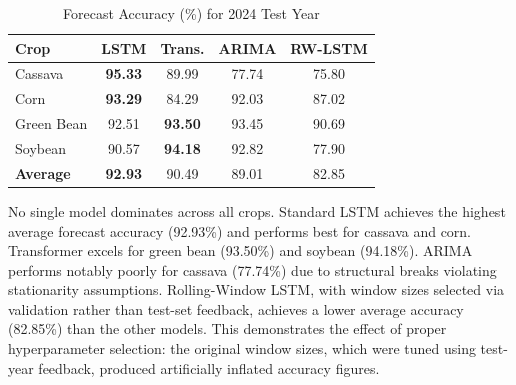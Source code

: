 \documentclass[conference]{IEEEtran}
\begin{document}
\begin{table}[htbp]
  \centering
  \caption{Forecast Accuracy (\%) for 2024 Test Year}
  \label{tab:accuracy}
  \begin{tabular}{lcccc}
    \toprule
    \textbf{Crop} & \textbf{LSTM} & \textbf{Trans.} & \textbf{ARIMA} & \textbf{RW-LSTM} \\
    \midrule
    Cassava    & \textbf{95.33} & 89.99 & 77.74 & 75.80 \\
    Corn       & \textbf{93.29} & 84.29 & 92.03 & 87.02 \\
    Green Bean & 92.51          & \textbf{93.50} & 93.45 & 90.69 \\
    Soybean    & 90.57          & \textbf{94.18} & 92.82 & 77.90 \\
    \midrule
    \textbf{Average} & \textbf{92.93} & 90.49 & 89.01 & 82.85 \\
    \bottomrule
  \end{tabular}
\end{table}

No single model dominates across all crops. Standard LSTM achieves the highest average forecast accuracy (92.93\%) and performs best for cassava and corn. Transformer excels for green bean (93.50\%) and soybean (94.18\%). ARIMA performs notably poorly for cassava (77.74\%) due to structural breaks violating stationarity assumptions. Rolling-Window LSTM, with window sizes selected via validation rather than test-set feedback, achieves a lower average accuracy (82.85\%) than the other models. This demonstrates the effect of proper hyperparameter selection: the original window sizes, which were tuned using test-year feedback, produced artificially inflated accuracy figures.
\end{document}
